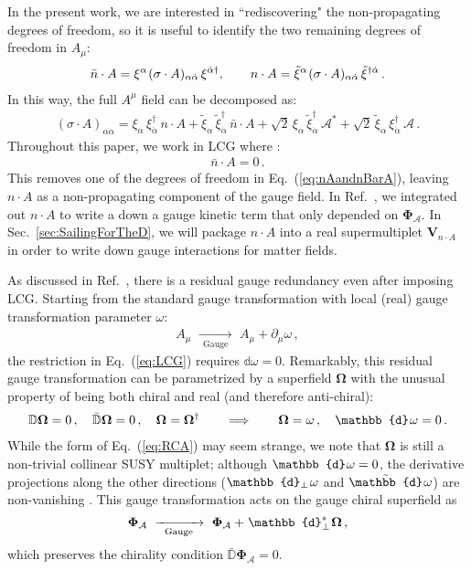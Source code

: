 \documentclass[12pt,document,nofootinbib,superscriptaddress,onecolumn,preprintnumbers,balancelastpage]{article}
\newcommand{\s}{\hspace{0.8pt}}
\newcommand{\PP}{\mathbb{d}}
\newcommand{\gauge}{\,\,\xrightarrow[\hspace{5pt}\text{Gauge}\hspace{5pt}]{}\,\,}
\DeclareRobustCommand{\Sec}[1]{Sec.~\ref{#1}}
\DeclareRobustCommand{\Eq}[1]{Eq.~(\ref{#1})}
\DeclareRobustCommand{\Ref}[1]{Ref.~\cite{#1}}
\newcommand{\bPhiA}{ \boldsymbol{\Phi}_\alc}
\newcommand{\bD}{ \boldsymbol{V}_{n \cdot A}}
\newcommand{\bPhialc}{ \boldsymbol{\Phi}_\alc}
\newcommand{\D}{\mathbb{D}}
\newcommand{\RCA}{\boldsymbol{\Omega}}
\newcommand{\alc}{\mathcal{A}}
\begin{document}
\begin{spacing}{1.2}
In the present work, we are interested in ``rediscovering" the non-propagating degrees of freedom, so it is useful to identify the two remaining degrees of freedom in $A_\mu$:
%
\begin{align}
\bar n \cdot A = \xi^\alpha\s (\sigma \cdot A)_{\alpha \dot{\alpha}}\, \xi^{\dot{\alpha} \dagger}, \qquad n\cdot A = \tilde \xi^\alpha \s(\sigma \cdot A)_{\alpha \dot{\alpha}}\, \tilde \xi^{\dagger \dot{\alpha}} \,.
\label{eq:nAandnBarA}
\end{align}
%
In this way, the full $A^\mu$ field can be decomposed as: 
%
\begin{align}
\left(\sigma \cdot A \right)_{\alpha \dot{\alpha}} = \xi_\alpha\, \xi^{\dagger}_{\dot{\alpha}}\, n\cdot A + \tilde{\xi}_\alpha\, \tilde{\xi}^\dagger_{\dot{\alpha}}\, \bar{n}\cdot A + \sqrt{2} \, \xi_\alpha\, \tilde{\xi}^\dagger_{\dot{\alpha}}\, \alc^* + \sqrt{2} \, \tilde{\xi}_\alpha\, \xi^{\dagger}_{\dot{\alpha}}\, \alc\,.
\end{align}
%
Throughout this paper, we work in LCG where \cite{Leibbrandt:1987qv}:
%
\begin{align}
\bar{n}\cdot A = 0\,.
\label{eq:LCG}
\end{align}
%
This removes one of the degrees of freedom in \Eq{eq:nAandnBarA}, leaving $n\cdot A$ as a non-propagating component of the gauge field.
%
In \Ref{Cohen:2018qvn}, we integrated out $n\cdot A$ to write a down a gauge kinetic term that only depended on $\bPhialc$.
%
In \Sec{sec:SailingForTheD}, we will package $n\cdot A$ into a real supermultiplet $\bD$ in order to write down gauge interactions for matter fields.


As discussed in \Ref{Cohen:2018qvn}, there is a residual gauge redundancy even after imposing LCG.
%
Starting from the standard gauge transformation with local (real) gauge transformation parameter $\omega$: 
%
\begin{align}
\label{eq:A4vectorGauge}
A_\mu \gauge A_\mu + \partial_\mu \omega \, ,
\end{align}
%
the restriction in \Eq{eq:LCG} requires $\PP \omega = 0$.
%
Remarkably, this residual gauge transformation can be parametrized by a superfield $\RCA$ with the unusual property of being both chiral and real (and therefore anti-chiral):
%
\begin{align}
\D \RCA = 0\, , \quad \bar{\D} \RCA = 0\,, \quad \RCA = \RCA^\dagger \qquad \Longrightarrow \qquad \RCA = \omega\,, \quad \PP \s\omega = 0\,.
\label{eq:RCA}
\end{align}
%
While the form of \Eq{eq:RCA} may seem strange, we note that $\RCA$ is still a non-trivial collinear SUSY multiplet; although $\PP\s \omega = 0$, the derivative projections along the other directions ($\PP_\perp\s \omega$ and $\tilde{\PP}\s \omega$) are non-vanishing \cite{Cohen:2018qvn}.
%
This gauge transformation acts on the gauge chiral superfield as
%
\begin{equation}
\label{eq:Phialcgauge}
\bPhialc \gauge \bPhiA + \s\PP_\perp^*\s \RCA \,,
\end{equation}
%
which preserves the chirality condition $\bar{\D} \bPhialc = 0$.





\end{spacing}
\end{document}
